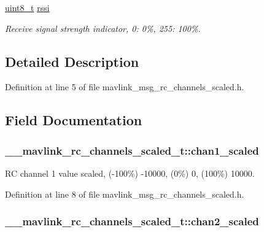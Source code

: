 \begin{DoxyCompactItemize}
\hyperlink{stdint_8h_aba7bc1797add20fe3efdf37ced1182c5}{uint8\-\_\-t} \hyperlink{struct____mavlink__rc__channels__scaled__t_a06ada0758b5f85258d48fd19ebe7a5bd}{rssi}
\begin{DoxyCompactList}\small\item\em Receive signal strength indicator, 0\-: 0\%, 255\-: 100\%. \end{DoxyCompactList}\end{DoxyCompactItemize}


\subsection{Detailed Description}


Definition at line 5 of file mavlink\-\_\-msg\-\_\-rc\-\_\-channels\-\_\-scaled.\-h.



\subsection{Field Documentation}
\hypertarget{struct____mavlink__rc__channels__scaled__t_a2d350897e12b0008208e61a031f01270}{
\subsubsection[{chan1\-\_\-scaled}]{ \-\_\-\-\_\-mavlink\-\_\-rc\-\_\-channels\-\_\-scaled\-\_\-t\-::chan1\-\_\-scaled}}\label{struct____mavlink__rc__channels__scaled__t_a2d350897e12b0008208e61a031f01270}


R\-C channel 1 value scaled, (-\/100\%) -\/10000, (0\%) 0, (100\%) 10000. 



Definition at line 8 of file mavlink\-\_\-msg\-\_\-rc\-\_\-channels\-\_\-scaled.\-h.

\hypertarget{struct____mavlink__rc__channels__scaled__t_a8ca88934095102f7195b4e5ab88ecd5c}{
\subsubsection[{chan2\-\_\-scaled}]{ \-\_\-\-\_\-mavlink\-\_\-rc\-\_\-channels\-\_\-scaled\-\_\-t\-::chan2\-\_\-scaled}}\label{struct____mavlink__rc__channels__scaled__t_a8ca88934095102f7195b4e5ab88ecd5c}


